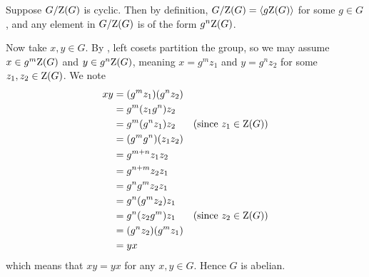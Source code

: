 \begin{questions}
    \item Suppose $G / \mathrm{Z}(G)$ is cyclic. Then by definition, $G / \mathrm{Z}(G) = \langle g\mathrm{Z}(G)\rangle$ for some $g \in G$, and any element in $G/\mathrm{Z}(G)$ is of the form $g^n\mathrm{Z}(G)$.

    Now take $x, y \in G$. By , left cosets partition the group, so we may assume $x \in g^m\mathrm{Z}(G)$ and $y \in g^n\mathrm{Z}(G)$, meaning $x = g^mz_1$ and $y = g^nz_2$ for some $z_1, z_2 \in \mathrm{Z}(G)$. We note
    \begin{align*}
        xy &= (g^mz_1)(g^nz_2)\\
        &= g^m(z_1g^n)z_2\\
        &= g^m(g^nz_1)z_2 & (\text{since }z_1 \in \mathrm{Z}(G))\\
        &= (g^mg^n)(z_1z_2)\\
        &= g^{m+n}z_1z_2\\
        &= g^{n+m}z_2z_1\\
        &= g^ng^mz_2z_1\\
        &= g^n(g^mz_2)z_1\\
        &= g^n(z_2g^m)z_1 & (\text{since }z_2 \in \mathrm{Z}(G))\\
        &= (g^nz_2)(g^mz_1)\\
        &= yx
    \end{align*}
    which means that $xy = yx$ for any $x, y \in G$. Hence $G$ is abelian.
\end{questions}
